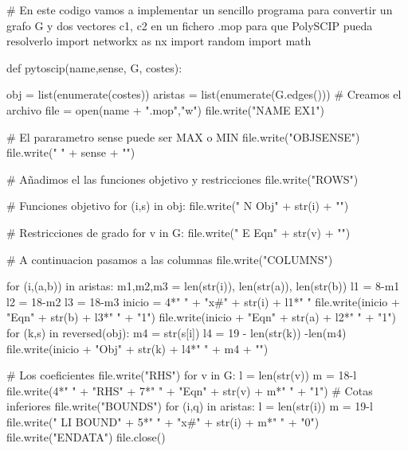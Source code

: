 \documentclass[twoside,a4paper,openright,12pt]{book}
\begin{document}
\begin{pythone}
# En este codigo vamos a implementar un sencillo programa para convertir un grafo G y dos vectores c1, c2 en un fichero .mop para que PolySCIP pueda resolverlo
import networkx as nx
import random
import math

def pytoscip(name,sense, G, costes):
    
    obj = list(enumerate(costes))
    aristas = list(enumerate(G.edges()))
    # Creamos el archivo
    file = open(name + ".mop","w") 
    file.write("NAME          EX1\n") 
    
    # El pararametro sense puede ser MAX o MIN
    file.write("OBJSENSE\n")    
    file.write(" " + sense + "\n") 

    # Añadimos el las funciones objetivo y restricciones
    file.write("ROWS\n")
    
    # Funciones objetivo
    for (i,s) in obj:
        file.write(" N  Obj" + str(i) + "\n")  
           
    # Restricciones de grado
    for v in G:
        file.write(" E  Eqn" + str(v) + "\n")
        
    # A continuacion pasamos a las columnas
    file.write("COLUMNS\n")
    
    for (i,(a,b)) in aristas:
        m1,m2,m3 = len(str(i)), len(str(a)), len(str(b))
        l1 = 8-m1
        l2 = 18-m2
        l3 = 18-m3
        inicio = 4*" " + "x#" + str(i) + l1*" " 
        file.write(inicio + "Eqn" + str(b) + l3*" " + "1\n")
        file.write(inicio + "Eqn" + str(a) + l2*" " + "1\n")
        for (k,s) in reversed(obj):
            m4 = str(s[i])
            l4 = 19 - len(str(k)) -len(m4)
            file.write(inicio + "Obj" + str(k) + l4*" " + m4 + "\n")
           
    # Los coeficientes
    file.write("RHS\n")
    for v in G:
        l = len(str(v))
        m = 18-l
        file.write(4*" " + "RHS" + 7*" " + "Eqn" + str(v) + m*" " + "1\n")    
    # Cotas inferiores 
    file.write("BOUNDS\n")        
    for (i,q) in aristas:
        l = len(str(i))
        m = 19-l
        file.write(" LI BOUND" + 5*" " + "x#" + str(i) + m*" " + "0\n")    
    file.write("ENDATA")
    file.close()
\end{pythone}

\newpage
\end{document}

